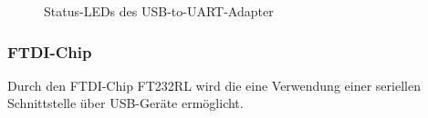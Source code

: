 \begin{figure}[H]
    \centering
    \qquad
    \qquad
    \caption[Status-LEDs des USB-to-UART-Adapter]{Status-LEDs des \gls{USB-to-UART}-Adapter}
    \label{fig:usbtouart-leds}
\end{figure}

\subsubsection{FTDI-Chip}
Durch den FTDI-Chip FT232RL wird die eine Verwendung einer seriellen Schnittstelle über USB-Geräte ermöglicht.

